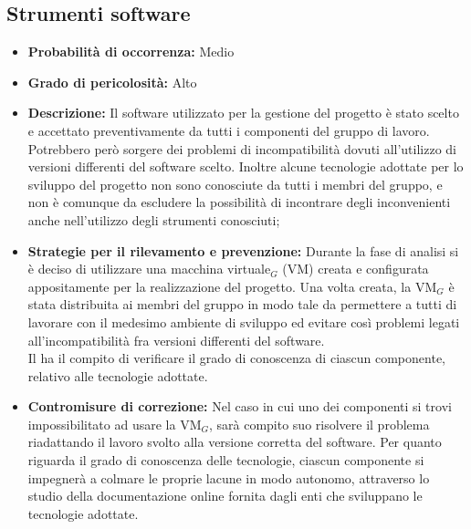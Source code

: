 \subsection{Strumenti software}
\begin{itemize}
\item \textbf{Probabilità di occorrenza:} Medio
\item \textbf{Grado di pericolosità:} Alto
\item \textbf{Descrizione:} Il software utilizzato per la gestione del progetto è stato scelto e accettato preventivamente da tutti i componenti del gruppo di lavoro. Potrebbero però sorgere dei problemi di incompatibilità dovuti all'utilizzo di versioni differenti del software scelto. Inoltre alcune tecnologie adottate per lo sviluppo del progetto non sono conosciute da tutti i membri del gruppo, e non è comunque da escludere la possibilità di incontrare degli inconvenienti anche nell'utilizzo degli strumenti conosciuti;

\item \textbf{Strategie per il rilevamento e prevenzione:} Durante la fase di analisi si è deciso di utilizzare una macchina virtuale$_G$ (VM) creata e configurata appositamente per la realizzazione del progetto. Una volta creata, la VM$_G$ è stata distribuita ai membri del gruppo in modo tale da permettere a tutti di lavorare con il medesimo ambiente di sviluppo ed evitare così problemi legati all'incompatibilità fra versioni differenti del software. \\
Il \ruoloResponsabile ha il compito di verificare il grado di conoscenza di ciascun componente, relativo alle tecnologie adottate. 
\item \textbf{Contromisure di correzione:} Nel caso in cui uno dei componenti si trovi impossibilitato ad usare la VM$_G$, sarà compito suo risolvere il problema riadattando il lavoro svolto alla versione corretta del software.
Per quanto riguarda il grado di conoscenza delle tecnologie, ciascun componente si impegnerà a colmare le proprie lacune in modo autonomo, attraverso lo studio della documentazione online fornita dagli enti che sviluppano le tecnologie adottate.
\end{itemize}


